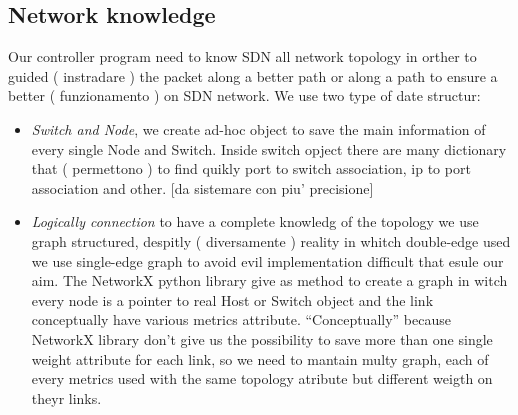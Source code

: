 \documentclass[conference,10pt]{IEEEtran}
\begin{document}
\subsection{Network knowledge}\label{sec:topo}
Our controller program need to know SDN all network topology in orther to guided ( instradare ) the packet along a better path or along a path to ensure 
a better ( funzionamento ) on SDN network.
We use two type of date structur:
\begin{itemize}
 \item \emph{Switch and Node}, we create ad-hoc object to save the main information of every single Node and Switch. Inside switch opject there are many 
 dictionary that ( permettono ) to find quikly port to switch association, ip to port association and other. [da sistemare con piu' precisione]
 \item \emph{Logically connection} to have a complete knowledg of the topology we use graph structured, despitly ( diversamente ) reality in
 whitch  double-edge used we use single-edge graph to avoid evil implementation difficult that esule our aim. The NetworkX python library give as method
 to create a graph in witch every node is a pointer to real Host or Switch object and the link conceptually have various metrics attribute.
 ``Conceptually'' because NetworkX library don't give us the possibility to save more than one single weight attribute for each link, so 
 we need to mantain multy graph, each of every metrics used with the same topology atribute but different weigth on theyr links.
\end{itemize}
\end{document}
